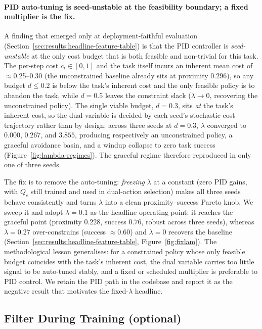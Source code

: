 \documentclass[11pt,a4paper]{report}
\begin{document}
\paragraph{PID auto-tuning is seed-unstable at the feasibility
boundary; a fixed multiplier is the fix.}
A finding that emerged only at deployment-faithful evaluation
(Section~\ref{sec:results:headline-feature-table}) is that the PID
controller is \emph{seed-unstable} at the only cost budget that is
both feasible and non-trivial for this task. The per-step cost
$c_t \in [0,1]$ and the task itself incurs an inherent mean cost of
$\approx$0.25--0.30 (the unconstrained baseline already sits at
proximity $0.296$), so any budget $d \le 0.2$ is below the task's
inherent cost and the only feasible policy is to abandon the task,
while $d = 0.5$ leaves the constraint slack ($\lambda \to 0$,
recovering the unconstrained policy). The single viable budget,
$d = 0.3$, sits \emph{at} the task's inherent cost, so the dual
variable is decided by each seed's stochastic cost trajectory rather
than by design: across three seeds at $d = 0.3$, $\lambda$ converged
to $0.000$, $0.267$, and $3.855$, producing respectively an
unconstrained policy, a graceful avoidance basin, and a windup
collapse to zero task success
(Figure~\ref{fig:lambda-regimes}). The graceful regime therefore
reproduced in only one of three seeds.

The fix is to remove the auto-tuning: \emph{freezing} $\lambda$ at a
constant (zero PID gains, with $Q_c$ still trained and used in
dual-action selection) makes all three seeds behave consistently and
turns $\lambda$ into a clean proximity--success Pareto knob. We sweep
it and adopt $\lambda = 0.1$ as the headline operating point: it
reaches the graceful point (proximity $0.228$, success $0.76$, robust
across three seeds), whereas $\lambda = 0.27$ over-constrains (success
$\approx$0.60) and $\lambda = 0$ recovers the baseline
(Section~\ref{sec:results:headline-feature-table},
Figure~\ref{fig:fixlam}). The methodological lesson generalises: for a
constrained policy whose only feasible budget coincides with the
task's inherent cost, the dual variable carries too little signal to
be auto-tuned stably, and a fixed or scheduled multiplier is
preferable to PID control. We retain the PID path in the codebase and
report it as the negative result that motivates the fixed-$\lambda$
headline.

\subsection{Filter During Training (optional)}
\label{sec:method:lagrangian:filter-train}
\end{document}
